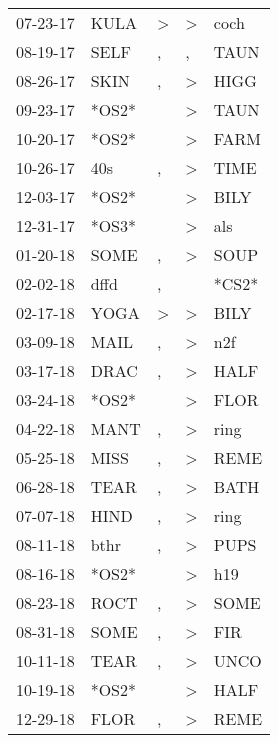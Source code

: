 \begin{supertabular}{lllll}
 07-23-17 &   KULA &  \textgreater &     \textgreater &   coch \\
 08-19-17 &   SELF &             , &                , &   TAUN \\
 08-26-17 &   SKIN &             , &     \textgreater &   HIGG \\
 09-23-17 &  *OS2* &               &     \textgreater &   TAUN \\
 10-20-17 &  *OS2* &               &     \textgreater &   FARM \\
 10-26-17 &    40s &             , &     \textgreater &   TIME \\
 12-03-17 &  *OS2* &               &     \textgreater &   BILY \\
 12-31-17 &  *OS3* &               &     \textgreater &    als \\
 01-20-18 &   SOME &             , &     \textgreater &   SOUP \\
 02-02-18 &   dffd &             , &                  &  *CS2* \\
 02-17-18 &   YOGA &  \textgreater &     \textgreater &   BILY \\
 03-09-18 &   MAIL &             , &     \textgreater &    n2f \\
 03-17-18 &   DRAC &             , &     \textgreater &   HALF \\
 03-24-18 &  *OS2* &               &     \textgreater &   FLOR \\
 04-22-18 &   MANT &             , &     \textgreater &   ring \\
 05-25-18 &   MISS &             , &     \textgreater &   REME \\
 06-28-18 &   TEAR &             , &     \textgreater &   BATH \\
 07-07-18 &   HIND &             , &     \textgreater &   ring \\
 08-11-18 &   bthr &             , &     \textgreater &   PUPS \\
 08-16-18 &  *OS2* &               &     \textgreater &    h19 \\
 08-23-18 &   ROCT &             , &     \textgreater &   SOME \\
 08-31-18 &   SOME &             , &     \textgreater &    FIR \\
 10-11-18 &   TEAR &             , &     \textgreater &   UNCO \\
 10-19-18 &  *OS2* &               &     \textgreater &   HALF \\
 12-29-18 &   FLOR &             , &     \textgreater &   REME \\

\end{supertabular}
